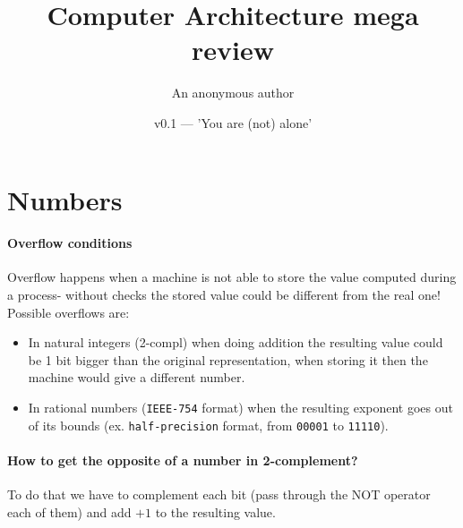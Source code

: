 \documentclass{scrartcl}
\title{Computer Architecture mega review}
\author{An anonymous author}
\date{v0.1 — 'You are (not) alone'}
\begin{document}
    \maketitle
    \section{Numbers}
    \paragraph{Overflow conditions}
    Overflow happens when a machine is not able to store the value computed during a process- without checks the stored value could be different from the real one! Possible overflows are:
    \begin{itemize}
        \item In natural integers (2-compl) when doing addition the resulting value could be 1 bit bigger than the original representation, when storing it then the machine would give a different number.
        \item In rational numbers (\texttt{IEEE-754} format) when the resulting exponent goes out of its bounds (ex. \texttt{half-precision} format, from \texttt{00001} to \texttt{11110}).
    \end{itemize}
    \paragraph{How to get the opposite of a number in 2-complement?}
    To do that we have to complement each bit (pass through the NOT operator each of them) and add $+1$ to the resulting value. 
\end{document}
